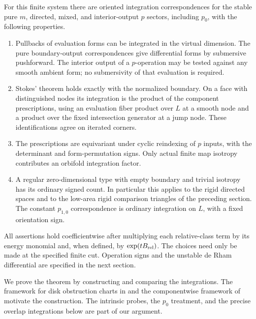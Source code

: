 \begin{theorem}\label{virt:finite-integration}
For this finite system there are oriented integration correspondences for
the stable pure $m$, directed, mixed, and interior-output $p$ sectors,
including $p_0$, with the following properties.
\begin{enumerate}[label=\textup{(\roman*)}]
\item Pullbacks of evaluation forms can be integrated in the virtual
dimension.  The pure boundary-output correspondences give differential
forms by submersive pushforward.  The interior output of a $p$-operation
may be tested against any smooth ambient form; no submersivity of that
evaluation is required.
\item Stokes' theorem holds exactly with the normalized boundary.  On a
face with distinguished nodes its integration is the product of the
component prescriptions, using an evaluation fiber product over $L$ at
a smooth node and a product over the fixed intersection generator at a
jump node.  These identifications agree on iterated corners.
\item The prescriptions are equivariant under cyclic reindexing of $p$
inputs, with the determinant and form-permutation signs.  Only actual
finite map isotropy contributes an orbifold integration factor.
\item A regular zero-dimensional type with empty boundary and trivial
isotropy has its ordinary signed count.  In particular this applies to
the rigid directed spaces and to the low-area rigid comparison triangles
of the preceding section.  The constant $p_{1,0}$ correspondence is
ordinary integration on $L$, with a fixed orientation sign.
\end{enumerate}
All assertions hold coefficientwise after multiplying each relative-class
term by its energy monomial and, when defined, by
$\exp(tB_{\rm rel})$.  The choices need only be made at the specified
finite cut.  Operation signs and the unstable de Rham differential are
specified in the next section.
\end{theorem}

We prove the theorem by constructing and comparing the integrations.
The framework for disk obstruction charts in
\cite[Theorem~7.1 and Condition~7.11]{fooo-i} and the componentwise
framework of \cite[Theorems~2.5, 5.3--5.4 and Remark~6.1]{fooo-ii}
motivate the construction.  The intrinsic probes, the $p_0$ treatment,
and the precise overlap integrations below are part of our argument.

